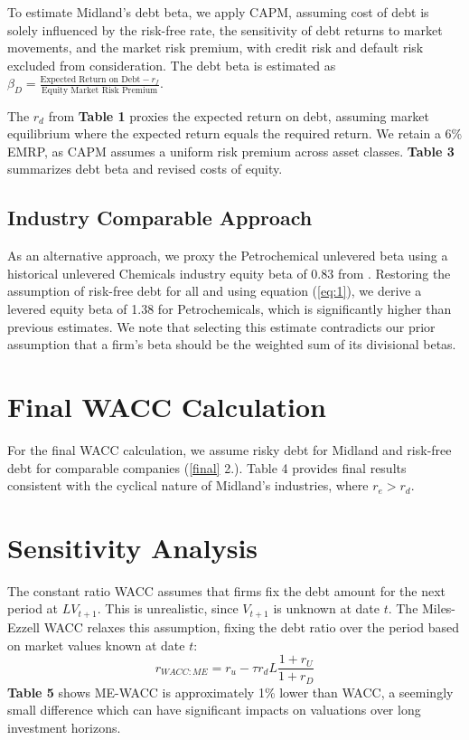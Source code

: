 \documentclass[AER]{AEA}
\begin{document}
\begin{spacing}{1.5}
To estimate Midland's debt beta, we apply CAPM, assuming cost of debt is solely influenced by the risk-free rate, the sensitivity of debt returns to market movements, and the market risk premium, with credit risk and default risk excluded from consideration. The debt beta is estimated as $\beta_D=\frac{\text{Expected Return on Debt}-r_f}{\text{Equity Market Risk Premium}}$. 

The $r_d$ from \textbf{Table 1} proxies the expected return on debt, assuming market equilibrium where the expected return equals the required return. We retain a 6\% EMRP, as CAPM assumes a uniform risk premium across asset classes. \textbf{Table 3} summarizes debt beta and revised costs of equity.

\subsection{Industry Comparable Approach}

As an alternative approach, we proxy the Petrochemical unlevered beta using a historical unlevered Chemicals industry equity beta of 0.83 from \textcite[]{Damodaran_2024}. Restoring the assumption of risk-free debt for all and using equation (\ref{eq:1}), we derive a levered equity beta of 1.38 for Petrochemicals, which is significantly higher than previous estimates. We note that selecting this estimate contradicts our prior assumption that a firm’s beta should be the weighted sum of its divisional betas.

\section{Final WACC Calculation}

For the final WACC calculation, we assume risky debt for Midland and risk-free debt for comparable companies (\ref{final} 2.). Table 4 provides final results consistent with the cyclical nature of Midland’s industries, where $r_e>r_d$.

\section{Sensitivity Analysis} \label{sensitivity}

The constant ratio WACC assumes that firms fix the debt amount for the next period at $LV_{t+1}$. This is unrealistic, since $V_{t+1}$ is unknown at date $t$. The Miles-Ezzell WACC relaxes this assumption, fixing the debt ratio over the period based on market values known at date $t$:\begin{equation}
    r_{W\!ACC\colon ME}=r_u-\tau r_dL\frac{1+r_U}{1+r_D}
\end{equation} \textbf{Table 5} shows ME-WACC is approximately 1\% lower than WACC, a seemingly small difference which can have significant impacts on valuations over long investment horizons.


\end{spacing}
\end{document}
